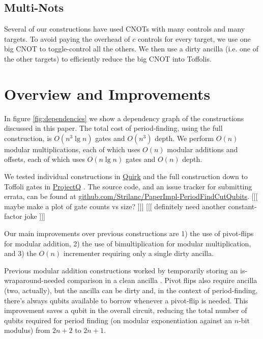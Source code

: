 \documentclass[twocolumn]{article}
\begin{document}
\subsection{Multi-Nots}

Several of our constructions have used CNOTs with many controls and many targets.
To avoid paying the overhead of $c$ controls for every target, we use one big CNOT to toggle-control all the others.
We then use a dirty ancilla (i.e. one of the other targets) to efficiently reduce the big CNOT into Toffolis.


\section{Overview and Improvements} \label{sec:costs}

In figure \ref{fig:dependencies} we show a dependency graph of the constructions discussed in this paper.
The total cost of period-finding, using the full construction, is $O(n^3 \lg n)$ gates and $O(n^3)$ depth.
We perform $O(n)$ modular multiplications, each of which uses $O(n)$ modular additions and offsets, each of which uses $O(n \lg n)$ gates \cite{haner2016} and $O(n)$ depth.

We tested individual constructions in \href{https://github.com/Strilanc/Quirk}{Quirk} and the full construction down to Toffoli gates in \href{https://github.com/ProjectQ-Framework/ProjectQ}{ProjectQ} \cite{projq2016}.
The source code, and an issue tracker for submitting errata, can be found at \href{https://github.com/Strilanc/PaperImpl-PeriodFindCutQubits}{github.com/Strilanc/PaperImpl-PeriodFindCutQubits}.
[[[ maybe make a plot of gate counts vs size? ]]] [[[ definitely need another constant-factor joke ]]]

Our main improvements over previous constructions are 1) the use of pivot-flips for modular addition, 2) the use of bimultiplication for modular multiplication, and 3) the $O(n)$ incrementer requiring only a single dirty ancilla.

Previous modular addition constructions worked by temporarily storing an is-wraparound-needed comparison in a clean ancilla \cite{takahashi2006, haner2016}.
Pivot flips also require ancilla (two, actually), but the ancilla can be dirty and, in the context of period-finding, there's always qubits available to borrow whenever a pivot-flip is needed.
This improvement saves a qubit in the overall circuit, reducing the total number of qubits required for period finding (on modular exponentiation against an $n$-bit modulus) from $2n+2$ to $2n+1$.
\end{document}
